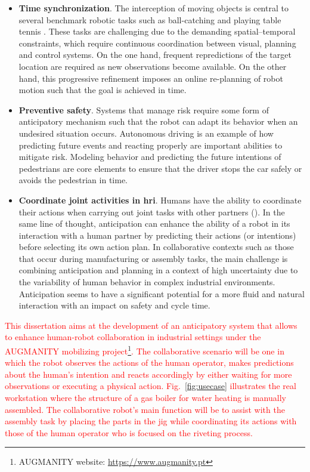 \begin{itemize}

\item \textbf{Time synchronization}. The interception of moving objects is central to several benchmark robotic tasks such as ball-catching and playing table tennis \cite{Carneiro2021, Wang2017}. These tasks are challenging due to the demanding spatial–temporal constraints, which require continuous coordination between visual, planning and control systems. On the one hand, frequent repredictions of the target location are required as new observations become available. On the other hand, this progressive refinement imposes an online re-planning of robot motion such that the goal is achieved in time.

\item \textbf{Preventive safety}. Systems that manage risk require some form of anticipatory mechanism such that the robot can adapt its behavior when an undesired situation occurs. Autonomous driving is an example of how predicting future events and reacting properly are important abilities to mitigate risk. Modeling behavior and predicting the future intentions of pedestrians are core elements to ensure that the driver stops the car safely or avoids the pedestrian in time.

\item \textbf{Coordinate joint activities in \acf{hri}}. Humans have the ability to coordinate their actions when carrying out joint tasks with other partners (\textcite{Sebanz2006,Hoffman2007}). In the same line of thought, anticipation can enhance the ability of a robot in its interaction with a human partner by predicting their actions (or intentions) before selecting its own action plan. In collaborative contexts such as those that occur during manufacturing or assembly tasks, the main challenge is combining anticipation and planning in a context of high uncertainty due to the variability of human behavior in complex industrial environments. Anticipation seems to have a significant potential for a more fluid and natural interaction with an impact on safety and cycle time.

\end{itemize}

\textcolor{red}{This dissertation aims at the development of an anticipatory system that allows to enhance human-robot collaboration in industrial settings under the AUGMANITY mobilizing project\footnote{AUGMANITY website: \url{https://www.augmanity.pt}}. The collaborative scenario will be one in which the robot observes the actions of the human operator, makes predictions about the human’s intention and reacts accordingly by either waiting for more observations or executing a physical action. Fig.~\ref{fig:usecase} illustrates the real workstation where the structure of a gas boiler for water heating is manually assembled. The collaborative robot’s main function will be to assist with the assembly task by placing the parts in the jig while coordinating its actions with those of the human
operator who is focused on the riveting process.}

